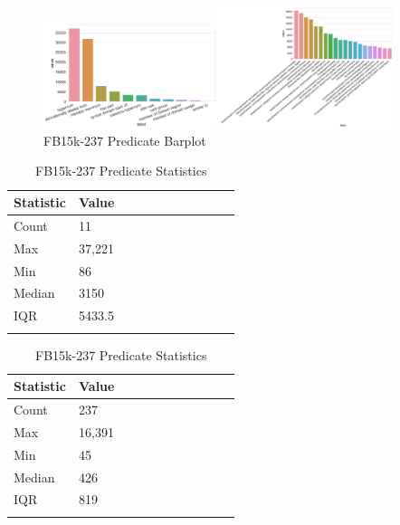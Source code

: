 \begin{figure}[H]
	\parbox{.5\linewidth}{
   		\centering
    		\includegraphics[width=0.45\textwidth, height=0.2\textheight]{WN18RR_Predicate_Counts}
		\caption{WN18RR Predicate Barplot}
		}
	\hfill
	\parbox{.5\linewidth}{
   		\centering
		\includegraphics[width=0.45\textwidth, height=0.2\textheight]{FB15k-237_Predicate_Counts}
		\caption{FB15k-237 Predicate Barplot}
		}
\end{figure}

\begin{table}[H]
	\parbox{.5\linewidth}{
		\centering
		\begin{tabular}{lllllllllll}
  			\textbf{Statistic} & \textbf{Value}  \\
  			\hline
			Count & 11 \\
			Max & 37,221  \\
			Min & 86 \\
  			Median & 3150  \\
  			IQR & 5433.5  \\
			&
		\end{tabular}
		\caption{WN18RR Predicate Statistics}
		}
	\hfill
	\parbox{.5\linewidth}{
		\centering
		\begin{tabular}{lllllllllll}
  			\textbf{Statistic} & \textbf{Value}  \\
  			\hline
			Count & 237 \\
			Max & 16,391 \\
			Min & 45  \\
  			Median & 426  \\
  			IQR & 819 \\
			&
		\end{tabular}
		\caption{FB15k-237 Predicate Statistics}
		}
\end{table}

